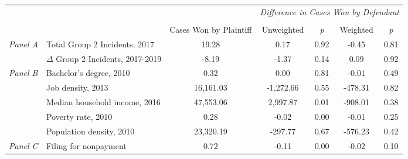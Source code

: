 \begin{tabular}{llccccc}
\toprule
 &  & \textit{} & \multicolumn{4}{c}{\textit{Difference in Cases Won by Defendant}} \\
\cline{4-7}
\\
 &  & Cases Won by Plaintiff & Unweighted & \emph{p} & Weighted & \emph{p} \\
\midrule
\multirow[c]{2}{.75cm}{\textit{Panel A}} & Total Group 2 Incidents, 2017 & 19.28 & 0.17 & 0.92 & -0.45 & 0.81 \\
 & $\Delta$ Group 2 Incidents, 2017-2019 & -8.19 & -1.37 & 0.14 & 0.09 & 0.92 \\
\cline{1-7}
\multirow[c]{5}{.75cm}{\textit{Panel B}} & Bachelor's degree, 2010 & 0.32 & 0.00 & 0.81 & -0.01 & 0.49 \\
 & Job density, 2013 & 16,161.03 & -1,272.66 & 0.55 & -478.31 & 0.82 \\
 & Median household income, 2016 & 47,553.06 & 2,997.87 & 0.01 & -908.01 & 0.38 \\
 & Poverty rate, 2010 & 0.28 & -0.02 & 0.00 & -0.01 & 0.25 \\
 & Population density, 2010 & 23,320.19 & -297.77 & 0.67 & -576.23 & 0.42 \\
\cline{1-7}
\textit{Panel C} & Filing for nonpayment & 0.72 & -0.11 & 0.00 & -0.02 & 0.10 \\
\cline{1-7}
\bottomrule
\end{tabular}
